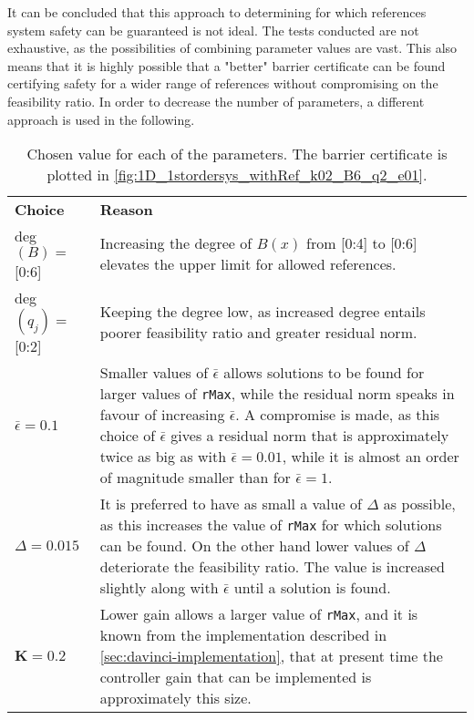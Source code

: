 It can be concluded that this approach to determining for which references system safety can be guaranteed is not ideal. The tests conducted are not exhaustive, as the possibilities of combining parameter values are vast. This also means that it is highly possible that a "better" barrier certificate can be found certifying safety for a wider range of references without compromising on the feasibility ratio.
In order to decrease the number of parameters, a different approach is used in the following.

\begin{table}[H]
	\begin{tabularx}{\textwidth}{l X}
		\rowcolor{HeaderBlue}
		\textbf{Choice} & \textbf{Reason}\\
		deg$(B)=$ [0:6] & Increasing the degree of $B(x)$ from [0:4] to [0:6] elevates the upper limit for allowed references.\\
		\rowcolor{textBlue}
		deg$(q_j)=$ [0:2] & Keeping the degree low, as increased degree entails poorer feasibility ratio and greater residual norm.\\
		$\bar{\epsilon}=0.1$ & Smaller values of  $\bar{\epsilon}$ allows solutions to be found for larger values of \texttt{rMax}, while the residual norm  speaks in favour of increasing $\bar{\epsilon}$. A compromise is made, as this choice of $\bar{\epsilon}$ gives a residual norm that is approximately twice as big as with $\bar{\epsilon}=0.01$, while it is almost an order of magnitude smaller than for $\bar{\epsilon}=1$.\\
		\rowcolor{textBlue}
		$\Delta=0.015$ & It is preferred to have as small a value of $\Delta$ as possible, as this increases the value of \texttt{rMax} for which solutions can be found. On the other hand lower  values of $\Delta$ deteriorate the feasibility ratio. The value is increased slightly along with $\bar{\epsilon}$ until a solution is found. \\
		$\textbf{K}=0.2$ & Lower gain allows a larger value of \texttt{rMax}, and it is known from the implementation described in \autoref{sec:davinci-implementation}, that at present time the controller gain that can be implemented is approximately this size.
	\end{tabularx}
	\caption{Chosen value for each of the parameters. The barrier certificate is plotted in \autoref{fig:1D_1stordersys_withRef_k02_B6_q2_e01}.}
	\label{tab:sostools_choice}
\end{table}



